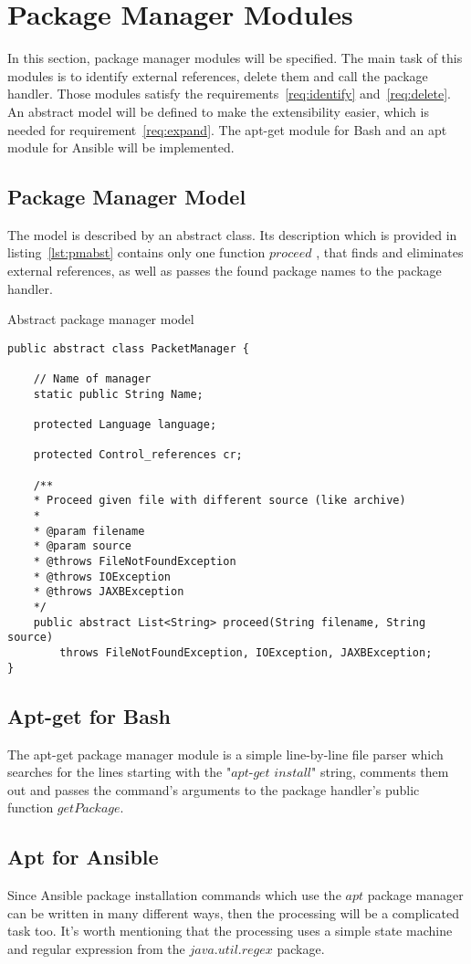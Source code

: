 \section{Package Manager Modules}
In this section, package manager modules will be specified.
The main task of this modules is to identify external references, delete them and call the package handler.
Those modules satisfy the requirements~\ref{req:identify} and~\ref{req:delete}.
An abstract model will be defined to make the extensibility easier, which is needed for requirement~\ref{req:expand}.
The apt-get module for Bash and an apt module for Ansible will be implemented.
\subsection*{Package Manager Model}
The model is described by an abstract class.
Its description which is provided in listing~\ref{lst:pmabst} contains only one function $proceed$ , that finds and eliminates external references, as well as passes the found package names to the package handler.
\begin{Listing}
	\caption{Abstract package manager model}
	\label{lst:pmabst}
\begin{lstlisting}
public abstract class PacketManager {
	
	// Name of manager
	static public String Name;
	
	protected Language language;
	
	protected Control_references cr;
	
	/**
	* Proceed given file with different source (like archive)
	* 
	* @param filename
	* @param source
	* @throws FileNotFoundException
	* @throws IOException
	* @throws JAXBException
	*/
	public abstract List<String> proceed(String filename, String source) 
		throws FileNotFoundException, IOException, JAXBException;
}
\end{lstlisting}
\end{Listing}
\subsection*{Apt-get for Bash}
The apt-get package manager module is a simple line-by-line file parser which searches for the lines starting with the "$apt$-$get$ $install$" string, comments them out and passes the command's arguments to the package handler's public function $getPackage$. 
\subsection*{Apt for Ansible}
Since Ansible package installation commands which use the $apt$ package manager can be written in many different ways, then the processing will be a complicated task too.
It's worth mentioning that the processing uses a simple state machine and regular expression from the $java$.$util$.$regex$ package.

